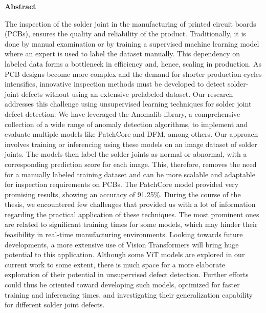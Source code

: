 
\begin{center}
\bfseries
{Abstract}
\normalfont
\end{center}
\sloppy
The inspection of the solder joint in the manufacturing of printed circuit boards (PCBs), ensures the quality and reliability of the product. Traditionally, it is done by manual examination or by training a supervised machine learning model where an expert is used to label the dataset manually. This dependency on labeled data forms a bottleneck in efficiency and, hence, scaling in production. As PCB designs become more complex and the demand for shorter production cycles intensifies, innovative inspection methods must be developed to detect solder-joint defects without using an extensive prelabeled dataset.
Our research addresses this challenge using unsupervised learning techniques for solder joint defect detection. We have leveraged the Anomalib library, a comprehensive collection of a wide range of anomaly detection algorithms, to implement and evaluate multiple models like PatchCore and DFM, among others. Our approach involves training or inferencing using these models on an image dataset of solder joints. The models then label the solder joints as normal or abnormal, with a corresponding prediction score for each image. This, therefore, removes the need for a manually labeled training dataset and can be more scalable and adaptable for inspection requirements on PCBs. The PatchCore model provided very promising results, showing an accuracy of 91.25\%.
During the course of the thesis, we encountered few challenges that provided us with a lot of information regarding the practical application of these techniques. The most prominent ones are related to significant training times for some models, which may hinder their feasibility in real-time manufacturing environments. Looking towards future developments, a more extensive use of Vision Transformers will bring huge potential to this application. Although some ViT models are explored in our current work to some extent, there is much space for a more elaborate exploration of their potential in unsupervised defect detection. Further efforts could thus be oriented toward developing such models, optimized for faster training and inferencing times, and investigating their generalization capability for different solder joint defects.